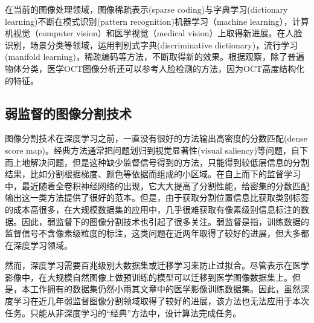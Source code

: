     在当前的图像处理领域，图像稀疏表示(sparse coding)与字典学习(dictionary learning)不断在模式识别(pattern recognition)机器学习（machine learning），计算机视觉（computer vision）和医学视觉（medical vision）上取得新进展。在人脸识别\cite{zhang2010discriminative,wright2009robust}，场景分类\cite{lazebnik2006beyond,gao2010kernel}等领域，运用判别式字典(discriminative dictionary)，流行学习(manifold learning)，稀疏编码等方法，不断取得新的效果。根据观察，除了普遍物体分类，医学OCT图像分析还可以参考人脸检测的方法，因为OCT高度结构化的特征。



    \subsection{弱监督的图像分割技术}
    图像分割技术在深度学习之前，一直没有很好的方法输出高密度的分数匹配(dense score map)。经典方法通常把问题划归到视觉显著性(visual saliency)\cite{han2006unsupervised,donoser2009saliency,yang2008unsupervised,chang2011co}等问题，自下而上地解决问题，但是这种缺少监督信号得到的方法，只能得到较低层信息的分割结果，比如分割根据梯度、颜色等依据而组成的小区域。在自上而下的监督学习中，最近随着全卷积神经网络\cite{long2015fully}的出现，它大大提高了分割性能，给密集的分数匹配输出这一类方法提供了很好的范本。但是，由于获取分割位置信息比获取类别标签的成本高很多，在大规模数据集的应用中，几乎很难获取有像素级别信息标注的数据。因此，弱监督下的图像分割技术也引起了很多关注。弱监督是指，训练数据的监督信号不含像素级粒度的标注，这类问题在近两年取得了较好的进展，但大多都在深度学习领域\cite{hong2015decoupled,pathak2014fully,oquab2015object,wei2016stc,papandreou2015weakly}。

    然而，深度学习需要百兆级别大数据集\cite{}或迁移学习\cite{shin2016deep,wangtransfer}来防止过拟合。尽管表示在医学影像中，在大规模自然图像上做预训练的模型可以迁移到医学图像数据集上。但是，本工作拥有的数据集仍然小雨其文章中的医学影像训练数据集。因此，虽然深度学习在近几年弱监督图像分割领域取得了较好的进展，该方法也无法应用于本次任务。只能从非深度学习的“经典”方法中，设计算法完成任务。





